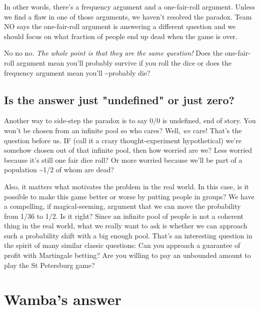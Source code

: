 \documentclass[article,twocolumn]{memoir}
\begin{document}
In other words, there's a frequency argument and a one-fair-roll argument. 
Unless we find a flaw in one of those arguments, we haven't resolved the paradox. 
Team NO says the one-fair-roll argument is answering a different question and we should focus on what fraction of people end up dead when the game is over.

No no no. 
\emph{The whole point is that they are the same question!}
Does the one-fair-roll argument mean you'll probably survive if you roll the dice or does the frequency argument mean you'll \~{}probably die?

\subsection{Is the answer just "undefined" or just zero?}

Another way to side-step the paradox is to say 0/0 is undefined, end of story.
You won't be chosen from an infinite pool so who cares?
Well, \emph{we} care! 
That's the question before us. 
IF (call it a crazy thought-experiment hypothetical) we're somehow chosen out of that infinite pool, then how worried are we? 
Less worried because it's still one fair dice roll? 
Or more worried because we'll be part of a population \~{}1/2 of whom are dead?

Also, it matters what motivates the problem in the real world.
In this case, is it possible to make this game better or worse by putting people in groups?
We have a compelling, if magical-seeming, argument that we can move the probability from 1/36 to 1/2.
Is it right? 
Since an infinite pool of people is not a coherent thing in the real world, what we really want to ask is whether we can approach such a probability shift with a big enough pool. 
That's an interesting question in the spirit of many similar classic questions: 
Can you approach a guarantee of profit with Martingale betting? 
Are you willing to pay an unbounded amount to play the St Petersburg game?

\section*{Wamba's answer}
\end{document}
